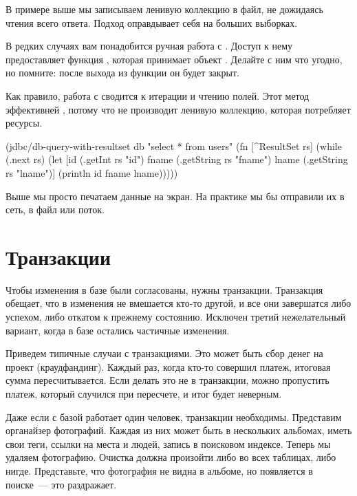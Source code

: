 В примере выше мы записываем ленивую коллекцию  в файл, не дожидаясь чтения всего ответа. Подход оправдывает себя на больших выборках.

В редких случаях вам понадобится ручная работа с . Доступ к нему предоставляет функция , которая принимает объект . Делайте с ним что угодно, но помните: после выхода из функции он будет закрыт.

Как правило, работа с  сводится к итерации  и чтению полей. Этот метод эффективней , потому что не производит ленивую коллекцию, которая потребляет ресурсы.

\begin{english}
  \begin{clojure}
(jdbc/db-query-with-resultset
 db "select * from users"
 (fn [^ResultSet rs]
   (while (.next rs)
     (let [id (.getInt rs "id")
           fname (.getString rs "fname")
           lname (.getString rs "lname")]
       (println id fname lname)))))
  \end{clojure}
\end{english}

Выше мы просто печатаем данные на экран. На практике мы бы отправили их в сеть, в файл или поток.

\section{Транзакции}

Чтобы изменения в базе были согласованы, нужны транзакции. Транзакция обещает, что в изменения не вмешается кто-то другой, и все они завершатся либо успехом, либо откатом к прежнему состоянию. Исключен третий нежелательный вариант, когда в базе остались частичные изменения.

Приведем типичные случаи с транзакциями. Это может быть сбор денег на проект (краудфандинг). Каждый раз, когда кто-то совершил платеж, итоговая сумма пересчитывается. Если делать это не в транзакции, можно пропустить платеж, который случился при пересчете, и итог будет неверным.

Даже если с базой работает один человек, транзакции необходимы. Представим органайзер фотографий. Каждая из них может быть в нескольких альбомах, иметь свои теги, ссылки на места и людей, запись в поисковом индексе. Теперь мы удаляем фотографию. Очистка должна произойти либо во всех таблицах, либо нигде. Представьте, что фотография не видна в альбоме, но появляется в поиске~--- это раздражает.

